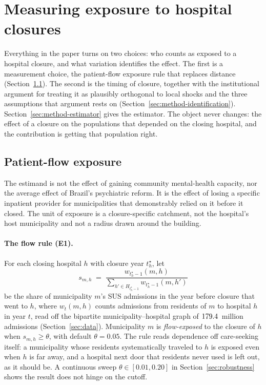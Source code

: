 \section{Measuring exposure to hospital closures}
\label{sec:method}

Everything in the paper turns on two choices: who counts as exposed to a
hospital closure, and what variation identifies the effect. The first is
a measurement choice, the patient-flow exposure rule that replaces
distance (Section~\ref{sec:method-exposure}). The second is the timing of
closure, together with the institutional argument for treating it as
plausibly orthogonal to local shocks and the three assumptions that
argument rests on (Section~\ref{sec:method-identification}).
Section~\ref{sec:method-estimator} gives the estimator. The object never
changes: the effect of a closure on the populations that depended on the
closing hospital, and the contribution is getting that population right.

\subsection{Patient-flow exposure}
\label{sec:method-exposure}

The estimand is not the effect of gaining community mental-health
capacity, nor the average effect of Brazil's psychiatric reform. It is
the effect of losing a specific inpatient provider for municipalities
that demonstrably relied on it before it closed. The unit of exposure is
a closure-specific catchment, not the hospital's host municipality and
not a radius drawn around the building.

\paragraph{The flow rule (E1).} For each closing hospital $h$ with
closure year $t_h^{\star}$, let
\begin{equation}
  s_{m, h} \;=\;
  \frac{w_{t_h^{\star} - 1}(m, h)}{\sum_{h' \in H_{t_h^{\star} - 1}}
  w_{t_h^{\star} - 1}(m, h')}
  \label{eq:share}
\end{equation}
be the share of municipality $m$'s SUS admissions in the year before
closure that went to $h$, where $w_t(m,h)$ counts admissions from
residents of $m$ to hospital $h$ in year $t$, read off the bipartite
municipality--hospital graph of $179.4$~million admissions
(Section~\ref{sec:data}). Municipality $m$ is \emph{flow-exposed} to the
closure of $h$ when $s_{m,h} \geq \theta$, with default $\theta = 0.05$.
The rule reads dependence off care-seeking itself: a municipality whose
residents systematically traveled to $h$ is exposed even when $h$ is far
away, and a hospital next door that residents never used is left out, as
it should be. A continuous sweep $\theta \in [0.01, 0.20]$ in
Section~\ref{sec:robustness} shows the result does not hinge on the cutoff.

